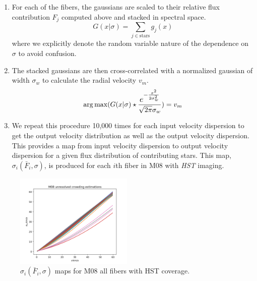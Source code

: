 \documentclass[%
 aip,
 twocolumn,
 jmp,%
 amsmath,amssymb,
 reprint,%
]{aastex61}
\begin{document}
\begin{enumerate}
	\item For each of the fibers, the gaussians are scaled to their relative flux contribution $F_j$ computed above and stacked in spectral space. 
	\begin{equation}
	G(x|\sigma) = \sum_{j \in \text{stars}}{g_j(x)}
	\end{equation}
	where we explicitly denote the random variable nature of the dependence on $\sigma$ to avoid confusion.
	\item The stacked gaussians are then cross-correlated with a
	normalized gaussian of width $\sigma_w$ to calculate the radial velocity $v_m$.
	\begin{equation}
    \arg\max( G(x|\sigma) \star
                          \frac{\mathlarger{
	                            \mathlarger{e^{-\frac{x^2}
	                                                 {2 \sigma_w ^2}
	                                          }
	                                       }
	                                       }
	                           }
	                   {\sqrt{2\pi}\sigma_w} 
	       ) = v_m
    \end{equation}
	\item We repeat this procedure 10,000 times for each
	input velocity dispersion to get the output velocity 
	distribution as well as the output velocity dispersion.
	This provides a map from input velocity dispersion to output
	velocity dispersion for a given flux distribution of contributing stars. This map, $\sigma_i(\bar{F}_i,\sigma)$,
	is produced for each $i$th fiber in M08 with {\it HST} imaging.

\end{enumerate}

\begin{figure}
\centering
\includegraphics[width=0.5\textwidth]{CROWDING/M08FIBERMOD.png}
\caption{$\sigma_i(\bar{F}_i,\sigma)$ maps for M08 all fibers with HST coverage.}       
\end{figure}
\end{document}
